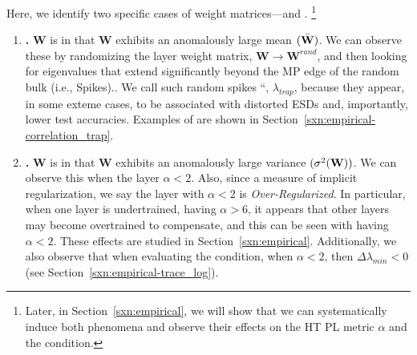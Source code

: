 Here, we identify two specific cases of \ATypical weight matrices---\CorrelationTraps and \emph{\OverRegularization}.%
\footnote{Later, in Section~\ref{sxn:empirical}, we will show that we can systematically induce both phenomena and observe their effects on the \HTSR HT PL metric $\alpha$ and the \SETOL \TRACELOG condition.}
\begin{enumerate}[label=3.3.\arabic*]
  \item 
  \textbf{\CorrelationTraps.} 
  $\mathbf{W}$ is \ATypical in that $\mathbf{W}$
 exhibits an anomalously large mean $(\bar{{\mathbf{W}}})$.  
  We can observe these by randomizing the layer weight matrix, $\mathbf{W}\rightarrow\mathbf{W}^{rand}$, and then looking
  for eigenvalues that extend significantly beyond the MP edge of the random bulk (i.e., Spikes)..  We call such random spikes
  ``\CorrelationTraps,  $\lambda_{trap}$, because they appear, in some exteme cases, to be associated with distorted ESDs
  and, importantly, lower test accuracies.  Examples of \CorrelationTraps are shown in Section~\ref{sxn:empirical-correlation_trap}.
  \item 
  \textbf{\OverRegularization.} 
  $\mathbf{W}$ is \ATypical in that $\mathbf{W}$ exhibits an anomalously large variance $(\sigma^2({\mathbf{W}}))$. 
  We can observe this when the layer  $\alpha < 2$.  Also, since \ALPHA a measure of implicit regularization, we say the layer with $\alpha<2$ is \emph{Over-Regularized}.
  In particular, when one layer is undertrained, having $\alpha>6$, it appears that other layers may become overtrained to compensate, and this can be seen with having $\alpha < 2$.
  These effects are studied in Section~\ref{sxn:empirical}.
  Additionally, we also observe that when evaluating the \SETOL \TRACELOG condition, when $\alpha < 2$, then $\Delta \lambda_{min}< 0$ (see Section~\ref{sxn:empirical-trace_log}).

\end{enumerate}









